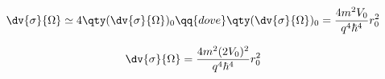 {\begin{soluzione}
   \begin{equation*}
      \dv{\sigma}{\Omega}
      \simeq 4 \qty( \dv{\sigma}{\Omega} )_0
      \qq{dove}
      \qty( \dv{\sigma}{\Omega} )_0
      =\frac{4 m^2 V_0}{q^4 \hbar^4} r_0^2
   \end{equation*}

   \begin{equation*}
      \dv{\sigma}{\Omega}
      =\frac{4 m^2 (2V_0)^2}{q^4 \hbar^4} r_0^2
   \end{equation*}
\end{soluzione}

\setcounter{equation}{0}

}